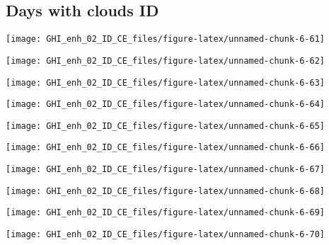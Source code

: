 \documentclass[
  10pt,
  a4paper,oneside]{article}
\begin{document}
\hypertarget{days-with-clouds-id}{%
\subsection{Days with clouds ID}\label{days-with-clouds-id}}

\begin{center}\texttt{[image: GHI\_enh\_02\_ID\_CE\_files/figure-latex/unnamed-chunk-6-61]} \end{center}

\begin{center}\texttt{[image: GHI\_enh\_02\_ID\_CE\_files/figure-latex/unnamed-chunk-6-62]} \end{center}

\begin{center}\texttt{[image: GHI\_enh\_02\_ID\_CE\_files/figure-latex/unnamed-chunk-6-63]} \end{center}

\begin{center}\texttt{[image: GHI\_enh\_02\_ID\_CE\_files/figure-latex/unnamed-chunk-6-64]} \end{center}

\begin{center}\texttt{[image: GHI\_enh\_02\_ID\_CE\_files/figure-latex/unnamed-chunk-6-65]} \end{center}

\begin{center}\texttt{[image: GHI\_enh\_02\_ID\_CE\_files/figure-latex/unnamed-chunk-6-66]} \end{center}

\begin{center}\texttt{[image: GHI\_enh\_02\_ID\_CE\_files/figure-latex/unnamed-chunk-6-67]} \end{center}

\begin{center}\texttt{[image: GHI\_enh\_02\_ID\_CE\_files/figure-latex/unnamed-chunk-6-68]} \end{center}

\begin{center}\texttt{[image: GHI\_enh\_02\_ID\_CE\_files/figure-latex/unnamed-chunk-6-69]} \end{center}

\begin{center}\texttt{[image: GHI\_enh\_02\_ID\_CE\_files/figure-latex/unnamed-chunk-6-70]} \end{center}
\end{document}
